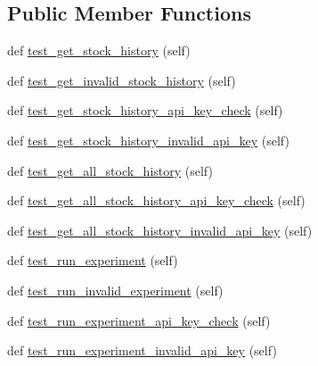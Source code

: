 \subsection*{Public Member Functions}
\begin{DoxyCompactItemize}
\item 
def \mbox{\hyperlink{classstocks_1_1tests_1_1_view_test_case_aeeb77affba267291807c3166878695b0}{test\+\_\+get\+\_\+stock\+\_\+history}} (self)
\item 
def \mbox{\hyperlink{classstocks_1_1tests_1_1_view_test_case_a5c517912eeb301485cf9348c1a15c337}{test\+\_\+get\+\_\+invalid\+\_\+stock\+\_\+history}} (self)
\item 
def \mbox{\hyperlink{classstocks_1_1tests_1_1_view_test_case_a9c483c27402609a2dee5464659d8fc0f}{test\+\_\+get\+\_\+stock\+\_\+history\+\_\+api\+\_\+key\+\_\+check}} (self)
\item 
def \mbox{\hyperlink{classstocks_1_1tests_1_1_view_test_case_ac2f58bc80e6aa03c3998c2bc6f55f339}{test\+\_\+get\+\_\+stock\+\_\+history\+\_\+invalid\+\_\+api\+\_\+key}} (self)
\item 
def \mbox{\hyperlink{classstocks_1_1tests_1_1_view_test_case_a86133da39156dbaa0091060ede0481aa}{test\+\_\+get\+\_\+all\+\_\+stock\+\_\+history}} (self)
\item 
def \mbox{\hyperlink{classstocks_1_1tests_1_1_view_test_case_a39ae95c8302a02d768ab763ea5ec7516}{test\+\_\+get\+\_\+all\+\_\+stock\+\_\+history\+\_\+api\+\_\+key\+\_\+check}} (self)
\item 
def \mbox{\hyperlink{classstocks_1_1tests_1_1_view_test_case_ae5a47bd1dada19b0c52707a79b46d71f}{test\+\_\+get\+\_\+all\+\_\+stock\+\_\+history\+\_\+invalid\+\_\+api\+\_\+key}} (self)
\item 
def \mbox{\hyperlink{classstocks_1_1tests_1_1_view_test_case_a55bfe0efa26d9744e8deff494b3efa44}{test\+\_\+run\+\_\+experiment}} (self)
\item 
def \mbox{\hyperlink{classstocks_1_1tests_1_1_view_test_case_aff28edc2c2f360e277d6df4aa76bb360}{test\+\_\+run\+\_\+invalid\+\_\+experiment}} (self)
\item 
def \mbox{\hyperlink{classstocks_1_1tests_1_1_view_test_case_aa70044a70ede048d43709cf890cc3587}{test\+\_\+run\+\_\+experiment\+\_\+api\+\_\+key\+\_\+check}} (self)
\item 
def \mbox{\hyperlink{classstocks_1_1tests_1_1_view_test_case_ab44cd3675788ad59ea5fd4d6e37903f2}{test\+\_\+run\+\_\+experiment\+\_\+invalid\+\_\+api\+\_\+key}} (self)
\item 

\end{DoxyCompactItemize}
